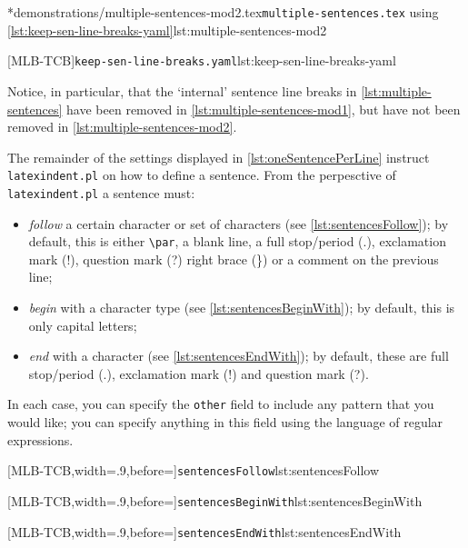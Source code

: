 	\begin{minipage}{.5\linewidth}
		\cmhlistingsfromfile*[showspaces=false]*{demonstrations/multiple-sentences-mod2.tex}{\texttt{multiple-sentences.tex} using \cref{lst:keep-sen-line-breaks-yaml}}{lst:multiple-sentences-mod2}
	\end{minipage}
	\hfill
	\begin{minipage}{.5\linewidth}
		[MLB-TCB]{\texttt{keep-sen-line-breaks.yaml}}{lst:keep-sen-line-breaks-yaml}
	\end{minipage}

	Notice, in particular, that the `internal' sentence line breaks in \cref{lst:multiple-sentences} have
	been removed in \cref{lst:multiple-sentences-mod1}, but have not been removed in \cref{lst:multiple-sentences-mod2}.

	The remainder of the settings displayed in \vref{lst:oneSentencePerLine} instruct \texttt{latexindent.pl} on how to define
	a sentence. From the perpesctive of \texttt{latexindent.pl} a sentence must:
	\begin{itemize}
		\item \emph{follow} a certain character or set of characters (see \cref{lst:sentencesFollow}); by default, this is either \lstinline!\par!, a blank line,
		      a full stop/period (.), exclamation mark (!), question mark (?) right brace (\}) or a comment
		      on the previous line;
		\item \emph{begin} with a character type (see \cref{lst:sentencesBeginWith}); by default, this is only capital letters;
		\item \emph{end} with a character (see \cref{lst:sentencesEndWith}); by default, these are
		      full stop/period (.), exclamation mark (!) and question mark (?).
	\end{itemize}
	In each case, you can specify the \texttt{other} field to include any pattern that you would like; you can specify anything in
	this field using the language of regular expressions.

	\begin{adjustwidth}{-3.5cm}{-2.5cm}
		\begin{minipage}{.36\linewidth}
			[MLB-TCB,width=.9\linewidth,before=\centering]{\texttt{sentencesFollow}}{lst:sentencesFollow}
		\end{minipage}
		\hfill
		\begin{minipage}{.31\linewidth}
			[MLB-TCB,width=.9\linewidth,before=\centering]{\texttt{sentencesBeginWith}}{lst:sentencesBeginWith}
		\end{minipage}
		\hfill
		\begin{minipage}{.31\linewidth}
			[MLB-TCB,width=.9\linewidth,before=\centering]{\texttt{sentencesEndWith}}{lst:sentencesEndWith}
		\end{minipage}
	\end{adjustwidth}

